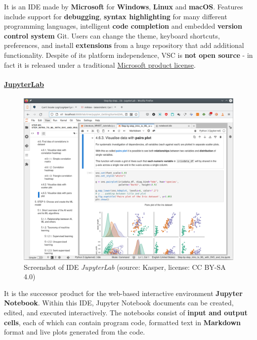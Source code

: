 \documentclass [oneside,10pt,a4paper,ngerman,BCOR10mm,headsepline,parindent,final]{scrartcl}
\begin{document}
It is an IDE made by \textbf{Microsoft} for \textbf{Windows},
\textbf{Linux} and \textbf{macOS}. Features include support for
\textbf{debugging}, \textbf{syntax highlighting} for many different
programming languages, intelligent \textbf{code completion} and embedded
\textbf{version control system} Git. Users can change the theme,
keyboard shortcuts, preferences, and install \textbf{extensions} from a
huge repository that add additional functionality. Despite of its
platform independence, VSC is \textbf{not open source} - in fact it is
released under a traditional
\href{https://code.visualstudio.com/License/}{Microsoft product
license}.

    \hypertarget{jupyterlab}{%
\paragraph{\texorpdfstring{\href{https://en.wikipedia.org/wiki/Project_Jupyter\#Jupyter_Notebook}{JupyterLab}}{JupyterLab}}\label{jupyterlab}}

\begin{figure}
\centering
\includegraphics{images/Screenshot_JupyterLab.png}
\caption{Screenshot of IDE \emph{JupyterLab} (source: Kasper, license:
CC BY-SA 4.0)}
\end{figure}

It is the successor product for the web-based interactive environment
\textbf{Jupyter Notebook}. Within this IDE, Jupyter Notebook documents
can be created, edited, and executed interactively. The notebooks
consist of \textbf{input and output cells}, each of which can contain
program code, formatted text in \textbf{Markdown} format and live plots
generated from the code.
\end{document}
